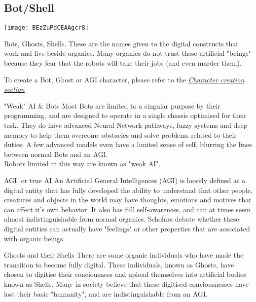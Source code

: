 \subsection{Bot/Shell}
\label{sec:specie-bots}

\texttt{[image: BEzZuPdCEAAgcr8]}

Bots, Ghosts, Shells. These are the names given to the digital constructs that work and live beside organics. Many organics do not trust these artificial "beings" because they fear that the robots will take their jobs (and even murder them).

To create a Bot, Ghost or AGI character, please refer to the \textit{\hyperref[sec:rules-creation]{Character creation section}}\\

\begin{genericsection}{"Weak" AI \& Bots}
Most Bots are limited to a singular purpose by their programming, and are designed to operate in a single chassis optimised for their task. They do have advanced Neural Network pathways, fuzzy systems and deep memory to help them overcome obstacles and solve problems related to their duties. A few advanced models even have a limited sense of self, blurring the lines between normal Bots and an AGI.\\

Robots limited in this way are known as "weak AI".
\end{genericsection}

\begin{genericsection}{AGI, or true AI}
An Artificial General Intelligences (AGI) is loosely defined as a digital entity that has fully developed the ability to understand that other people, creatures and objects in the world may have thoughts, emotions and motives that can affect it's own behavior. It also has full self-awareness, and can at times seem almost indistinguishable from normal organics. Scholars debate whether these digital entities can actually have "feelings" or other properties that are associated with organic beings.
\end{genericsection}

\begin{genericsection}{Ghosts and their Shells}
There are some organic individuals who have made the transition to become fully digital. These individuals, known as Ghosts, have chosen to digitise their conciousness and upload themselves into artificial bodies known as Shells. Many in society believe that these digitised conciousnesses have lost their basic "humanity", and are indistinguishable from an AGI.
\end{genericsection}

